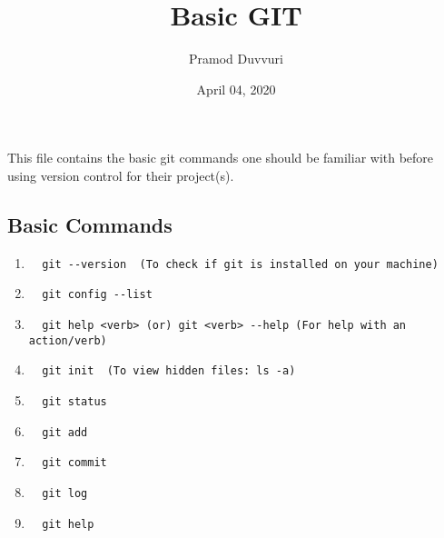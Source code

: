 \documentclass[11pt]{article}
\title{Basic GIT}
\author{Pramod Duvvuri}
\date{April 04, 2020}
\begin{document}
	\maketitle
	This file contains the basic git commands one should be familiar with before using version control for their project(s).
   \subsection*{Basic Commands}
   \begin{enumerate}
   	\item \begin{verbatim}  git --version  (To check if git is installed on your machine)\end{verbatim}
   	\item \begin{verbatim}  git config --list\end{verbatim}
   	\item \begin{verbatim}  git help <verb> (or) git <verb> --help (For help with an action/verb) \end{verbatim}
   	\item \begin{verbatim}  git init  (To view hidden files: ls -a)\end{verbatim}
    \item \begin{verbatim}  git status \end{verbatim}  	
    \item \begin{verbatim}  git add \end{verbatim}  	
    \item \begin{verbatim}  git commit \end{verbatim}  	
    \item \begin{verbatim}  git log \end{verbatim}  	
    \item \begin{verbatim}  git help \end{verbatim}  	   
   \end{enumerate}
\end{document}
